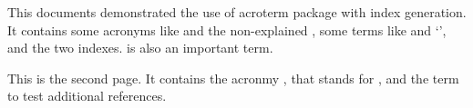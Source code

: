 \documentclass{article}
\begin{document}
\noindent
This documents demonstrated the use of acroterm package with index generation.
It contains some acronyms like  and the
non-explained , some terms like 
and `', and the two indexes.
 is also an important term.

\printsubindex[idx]
\printsubindex[acronym]

\pagebreak
\noindent
This is the second page. It contains the acronmy , that stands
for , and the term  to test 
additional references.


\end{document}
